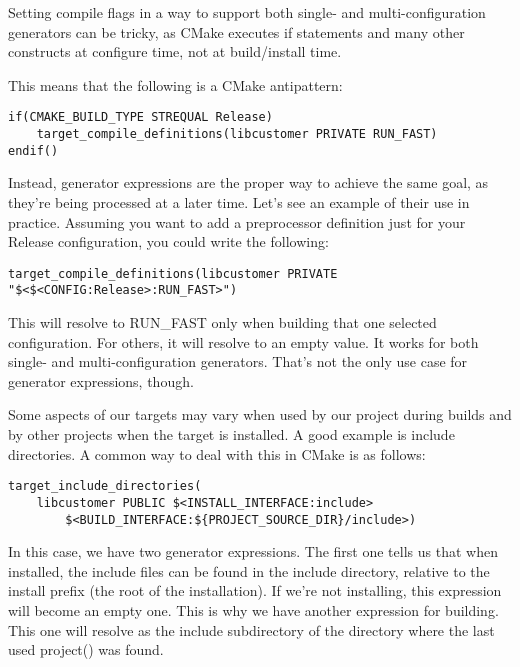 
Setting compile flags in a way to support both single- and multi-configuration generators can be tricky, as CMake executes if statements and many other constructs at configure time, not at build/install time.

This means that the following is a CMake antipattern:

\begin{lstlisting}[style=styleCMake]
if(CMAKE_BUILD_TYPE STREQUAL Release)
	target_compile_definitions(libcustomer PRIVATE RUN_FAST)
endif()
\end{lstlisting}

Instead, generator expressions are the proper way to achieve the same goal, as they're being processed at a later time. Let's see an example of their use in practice. Assuming you want to add a preprocessor definition just for your Release configuration, you could write the following:

\begin{lstlisting}[style=styleCMake]
target_compile_definitions(libcustomer PRIVATE
"$<$<CONFIG:Release>:RUN_FAST>")
\end{lstlisting}

This will resolve to RUN\_FAST only when building that one selected configuration. For others, it will resolve to an empty value. It works for both single- and multi-configuration generators. That's not the only use case for generator expressions, though.

Some aspects of our targets may vary when used by our project during builds and by other projects when the target is installed. A good example is include directories. A common way to deal with this in CMake is as follows:

\begin{lstlisting}[style=styleCMake]
target_include_directories(
	libcustomer PUBLIC $<INSTALL_INTERFACE:include>
		$<BUILD_INTERFACE:${PROJECT_SOURCE_DIR}/include>)
\end{lstlisting}

In this case, we have two generator expressions. The first one tells us that when installed, the include files can be found in the include directory, relative to the install prefix (the root of the installation). If we're not installing, this expression will become an empty one. This is why we have another expression for building. This one will resolve as the include subdirectory of the directory where the last used project() was found.


